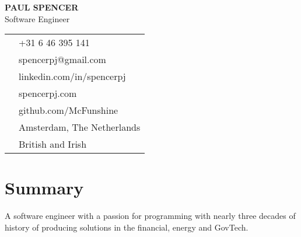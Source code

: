 \documentclass[11pt,a4paper]{article}
\newcommand{\contactItem}[2]{
    {\color{secondary}\small#1} & #2 \\
}
\begin{document}
\begin{center}
    {\Huge\textbf{PAUL SPENCER}}\\[0.5em]
    {\color{secondary}\large Software Engineer}\\[1em]
\end{center}

\begin{tabular}{ll}
    \contactItem{\faPhone}{+31 6 46 395 141}
    \contactItem{\faEnvelope}{spencerpj@gmail.com}
    \contactItem{\faLinkedin}{linkedin.com/in/spencerpj}
    \contactItem{\faGlobe}{spencerpj.com}
    \contactItem{\faGithub}{github.com/McFunshine}
    \contactItem{\faMapMarker}{Amsterdam, The Netherlands}
    \contactItem{\faFlag}{British and Irish}
\end{tabular}

\section{Summary}
A software engineer with a passion for programming with nearly three decades of history of producing solutions in the financial, energy and GovTech.
\end{document}
